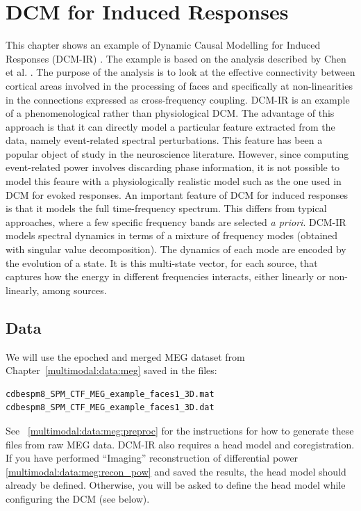 \chapter{DCM for Induced Responses \label{Chap:data:dcm_ir}}

This chapter shows an example of Dynamic Causal Modelling for Induced Responses (DCM-IR) \cite{cc_induced}. The example is based on the analysis described by Chen et al. \cite{cc_asymm}. The purpose of the analysis is to look at the effective connectivity between cortical areas involved in the processing of faces and specifically at non-linearities in the connections expressed as cross-frequency coupling. DCM-IR is an example of a phenomenological rather than physiological DCM. The advantage of this approach is that it can directly model a particular feature extracted from the data, namely event-related spectral perturbations. This feature has been a popular object of study in the neuroscience literature. However, since computing event-related power involves discarding phase information, it is not possible to model this feaure with a physiologically realistic model such as the one used in DCM for evoked responses. An important feature of DCM for induced responses is that it models the full time-frequency spectrum. This differs from typical approaches, where a few specific frequency bands are selected \textit{a priori}. DCM-IR models spectral dynamics in terms of a mixture of frequency modes (obtained with singular value decomposition). The dynamics of each mode are encoded by the evolution of a state. It is this multi-state vector, for each source, that captures how the energy in different frequencies interacts, either linearly or non-linearly, among sources.

\section{Data}

We will use the epoched and merged MEG dataset from Chapter~\ref{multimodal:data:meg} saved in the files:

\begin{verbatim}
cdbespm8_SPM_CTF_MEG_example_faces1_3D.mat
cdbespm8_SPM_CTF_MEG_example_faces1_3D.dat
\end{verbatim}

See ~\ref{multimodal:data:meg:preproc} for the instructions for how to generate these files from raw MEG data. DCM-IR also requires a head model and coregistration. If you have performed ``Imaging'' reconstruction of differential power \ref{multimodal:data:meg:recon_pow} and saved the results, the head model should already be defined. Otherwise, you will be asked to define the head model while configuring the DCM (see below).

